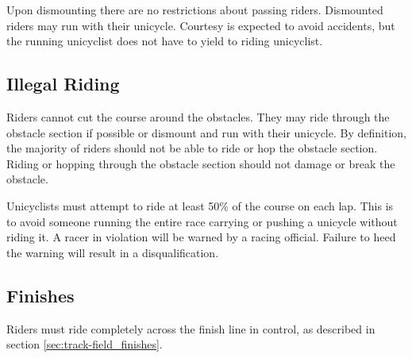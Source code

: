 Upon dismounting there are no restrictions about passing riders.
Dismounted riders may run with their unicycle.
Courtesy is expected to avoid accidents, but the running unicyclist does not have to yield to riding unicyclist.

\subsection{Illegal Riding}

Riders cannot cut the course around the obstacles.
They may ride through the obstacle section if possible or dismount and run with their unicycle.
By definition, the majority of riders should not be able to ride or hop the obstacle section.
Riding or hopping through the obstacle section should not damage or break the obstacle.

Unicyclists must attempt to ride at least 50\% of the course on each lap.
This is to avoid someone running the entire race carrying or pushing a unicycle without riding it. 
A racer in violation will be warned by a racing official.
Failure to heed the warning will result in a disqualification.

\subsection{Finishes}

Riders must ride completely across the finish line in control, as described in section \ref{sec:track-field_finishes}.
